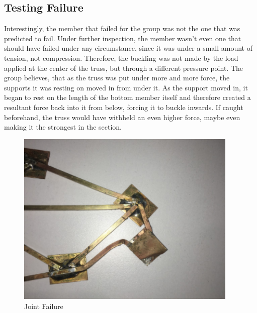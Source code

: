 \documentclass{article}
\begin{document}
\subsection{Testing Failure}
Interestingly, the member that failed for the group was not the one that was predicted to fail. Under further inspection, the member wasn't even one that should have failed under any circumstance, since it was under a small amount of tension, not compression. Therefore, the buckling was not made by the load applied at the center of the truss, but through a different pressure point. The group believes, that as the truss was put under more and more force, the supports it was resting on moved in from under it. As the support moved in, it began to rest on the length of the bottom member itself and therefore created a resultant force back into it from below, forcing it to buckle inwards. If caught beforehand, the truss would have withheld an even higher force, maybe even making it the strongest in the section.

\begin{figure}[ht]
\caption{Joint Failure}
\centering
\includegraphics[width=300pt]{BuckledMember.png}
\end{figure}
\end{document}
